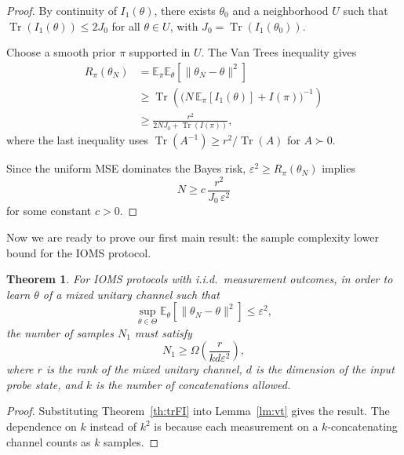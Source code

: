 \documentclass[12pt]{article}
\newtheorem{theorem}{Theorem}
\begin{document}
\begin{proof}
By continuity of $I_1(\theta)$, there exists $\theta_0$ and a neighborhood 
$U$ such that $\operatorname{Tr}(I_1(\theta)) \le 2J_0$ for all $\theta\in U$, 
with $J_0 = \operatorname{Tr}(I_1(\theta_0))$.

Choose a smooth prior $\pi$ supported in $U$. 
The Van Trees inequality gives
\begin{equation}
\begin{split}
    R_\pi(\theta_N)
    &= \mathbb{E}_\pi\mathbb{E}_\theta[\|\theta_N-\theta\|^2] \\
    &\ge 
    \operatorname{Tr}\!\left(\big(N\,\mathbb{E}_\pi[I_1(\theta)]+I(\pi)\big)^{-1}\right) \\
    &\ge \frac{r^2}{2N J_0+\operatorname{Tr}(I(\pi))},
\end{split}
\end{equation}
where the last inequality uses 
$\operatorname{Tr}(A^{-1}) \ge r^2/\operatorname{Tr}(A)$ for $A\succ0$.

Since the uniform MSE dominates the Bayes risk, 
$\varepsilon^2 \ge R_\pi(\theta_N)$ implies 
\begin{equation}
    N \ge c\,\frac{r^2}{J_0\,\varepsilon^2}
\end{equation}
for some constant $c>0$. 
\end{proof}

Now we are ready to prove our first main result: the sample complexity lower bound for the IOMS protocol.

\begin{theorem}
    For IOMS protocols with i.i.d.\ measurement outcomes, in order to learn $\theta$ of a mixed unitary channel such that
    \begin{equation}
        \sup_{\theta\in\Theta}\mathbb{E}_\theta\!\left[\|\theta_N-\theta\|^2\right] \le \varepsilon^2,
    \end{equation}
    the number of samples $N_1$ must satisfy
    \begin{equation}
        N_1 \ge \Omega\!\left(\frac{r}{k d \varepsilon^2}\right),
    \end{equation}
    where $r$ is the rank of the mixed unitary channel, $d$ is the dimension of the input probe state, and $k$ is the number of concatenations allowed.
\end{theorem}

\begin{proof}
    Substituting Theorem~\ref{th:trFI} into Lemma~\ref{lm:vt} gives the result. The dependence on $k$ instead of $k^2$ is because each measurement on a $k$-concatenating channel counts as $k$ samples.
\end{proof}
\end{document}
